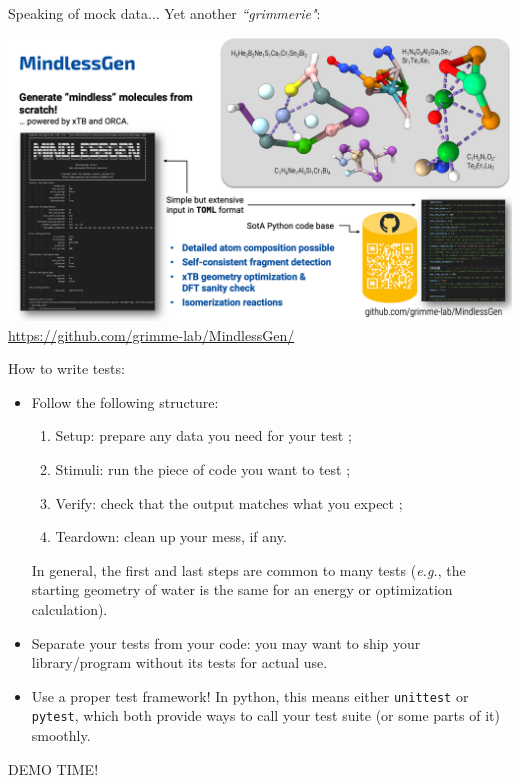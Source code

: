 \documentclass[10pt,
aspectratio=169
]{beamer}
\begin{document}
\begin{frame}
	Speaking of mock data... Yet another \textit{``grimmerie"}:
	\begin{center}
	\includegraphics[width=.7\linewidth]{im/MindlessGen}
	\url{https://github.com/grimme-lab/MindlessGen/}
	\end{center}
\end{frame}

\begin{frame}
	How to write tests:\begin{itemize}
		\item Follow the following structure:\begin{enumerate}
			\item Setup: prepare any data you need for your test ;
			\item Stimuli: run the piece of code you want to test ;
			\item Verify: check that the output matches what you expect ;
			\item Teardown: clean up your mess, if any.
		\end{enumerate}
		In general, the first and last steps are common to many tests (\textit{e.g.}, the starting geometry of water is the same for an energy or optimization calculation).
		\item Separate your tests from your code: you may want to ship your library/program without its tests for actual use.
		\item Use a proper test framework! In python, this means either \texttt{unittest} or \texttt{pytest}, which both provide ways to call your test suite (or some parts of it) smoothly.
	\end{itemize}
\end{frame}

\begin{frame}
\begin{center}
	{\LARGE DEMO TIME!}
\end{center}
\end{frame}
\end{document}
